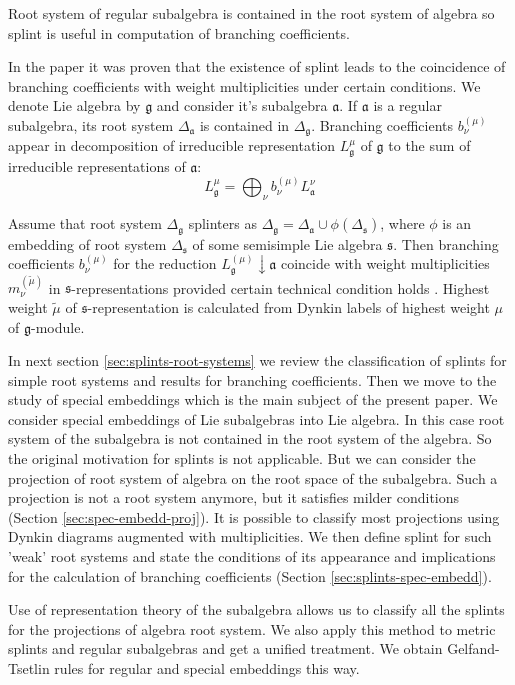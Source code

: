 \documentclass{article}
\newcommand{\gf}{\mathfrak{g}}
\newcommand{\af}{\mathfrak{a}}
\newcommand{\sfr}{\mathfrak{s}}
\begin{document}
Root system of regular subalgebra is contained in the root system of algebra so splint is useful in
computation of branching coefficients. 

In the paper \cite{2011arXiv1111.6787L} it was proven that the existence of splint leads to the
coincidence of branching coefficients with weight multiplicities under certain conditions. We denote
Lie algebra by $\gf$ and consider it's subalgebra $\af$. If $\af$ is a regular subalgebra, its root
system $\Delta_{\af}$ is contained in $\Delta_{\gf}$. Branching coefficients $b^{(\mu)}_{\nu}$
appear in decomposition of irreducible representation $L^{\mu}_{\gf}$ of $\gf$ to the sum of
irreducible representations of $\af$:
\begin{equation}
  \label{eq:1}
  L^{\mu}_{\gf}=\bigoplus_{\nu} b^{(\mu)}_{\nu} L^{\nu}_{\af}
\end{equation}

Assume that root system $\Delta_{\gf}$ splinters as $\Delta_{\gf}=\Delta_{\af} \cup
\phi(\Delta_{\sfr})$, where $\phi$ is an embedding of root system $\Delta_{\sfr}$ of some semisimple
Lie algebra $\sfr$. Then branching coefficients $b^{(\mu)}_{\nu}$ for the reduction
$L^{(\mu)}_{\gf}\downarrow \af$ coincide with weight multiplicities $m^{(\tilde \mu)}_{\nu}$ in
$\sfr$-representations provided certain technical condition holds \cite{2011arXiv1111.6787L}.
Highest weight $\tilde\mu$ of $\sfr$-representation is calculated from Dynkin labels of highest
weight $\mu$ of $\gf$-module.


In next section \ref{sec:splints-root-systems} we review the classification of splints for simple
root systems and results for branching coefficients. Then we move to the study of special embeddings
which is the main subject of the present paper. We consider special embeddings of Lie subalgebras
into Lie algebra. In this case root system of the subalgebra is not contained in the root system of
the algebra. So the original motivation for splints is not applicable. But we can consider the
projection of root system of algebra on the root space of the subalgebra. Such a projection is not a
root system anymore, but it satisfies milder conditions (Section \ref{sec:spec-embedd-proj}). It is
possible to classify most projections using Dynkin diagrams augmented with multiplicities. We then
define splint for such 'weak' root systems and state the conditions of its appearance and
implications for the calculation of branching coefficients (Section \ref{sec:splints-spec-embedd}).

Use of representation theory of the subalgebra allows us to classify all the splints for the projections
of algebra root system. We also apply this method to metric splints and regular subalgebras and get
a unified treatment. We obtain Gelfand-Tsetlin rules for regular and special embeddings this way.
\end{document}
